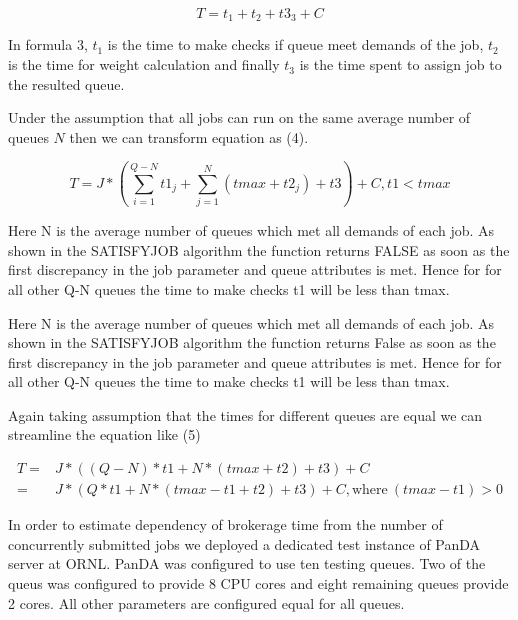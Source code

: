 \begin{equation}
T = t_1 + t_2 + t3_3 + C
\end{equation}

In formula 3, $t_1$ is the time to make checks if queue meet demands of the
job, $t_2$ is the time for weight calculation and finally $t_3$ is the time
spent to assign job to the resulted queue. 

Under the assumption that all jobs can run on the same average number of queues
$N$ then we can transform equation as (4).

\begin{equation}
T = J * \left ( \sum_{i = 1}^{Q - N} t1_j + \sum_{j = 1}^{N} (tmax + t2_j) + t3 \right) + C, t1 < tmax
\end{equation}

Here N is the average number of queues which met all demands of each job.  As shown in the SATISFY{\textunderscore}JOB algorithm the function returns FALSE as soon as the first discrepancy in the job parameter and queue attributes is met. Hence for for all other Q-N queues the time to make checks  t1 will be less than tmax.

Here N is the average number of queues which met all demands of each job. As shown in the SATISFY{\textunderscore}JOB algorithm the function returns False as
soon as the first discrepancy in the job parameter and queue attributes is met.
Hence for for all other Q-N queues the time to make checks t1 will be less than tmax.

Again taking assumption that the times for different queues are equal we can
streamline the equation like (5)

\begin{equation}
  \begin{aligned}
    T =& J * \left(( Q - N) * t1 + N * (tmax + t2) + t3 \right) + C \\
     =& J * \left(Q * t1 + N * (tmax - t1 + t2) + t3 \right) + C,
        \text{where}~(tmax - t1) > 0
  \end{aligned}
\end{equation}

In order to estimate dependency of brokerage time from the number of
concurrently submitted jobs we deployed a dedicated test instance of PanDA
server at ORNL. PanDA was configured to use ten testing queues. Two of the
queus was configured to provide 8 CPU cores and eight remaining queues provide
2 cores. All other parameters are configured equal for all queues.

